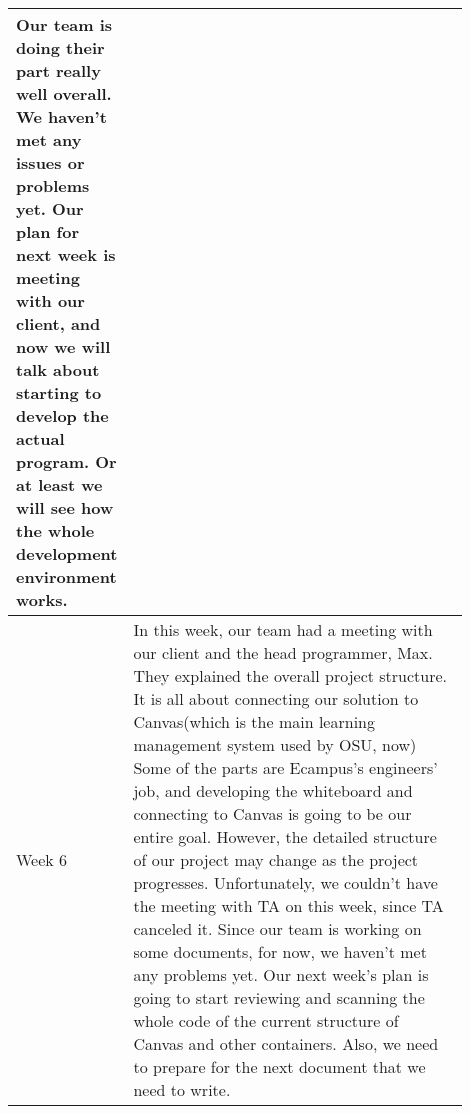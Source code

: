 \documentclass[10pt]{article}
\begin{document}
\begin{center}
\begin{tabular}{ | p{0.1\linewidth} | p{0.8\linewidth} | }
            Our team is doing their part really well overall.
            We haven't met any issues or problems yet.
            Our plan for next week is meeting with our client, and now we will talk about starting to develop the actual program.
            Or at least we will see how the whole development environment works.  \\ \hline 
            Week 6 &  In this week, our team had a meeting with our client and the head programmer, Max.
            They explained the overall project structure. It is all about connecting our solution to Canvas(which is the main learning management system used by OSU, now)
            Some of the parts are Ecampus's engineers' job, and developing the whiteboard and connecting to Canvas is going to be our entire goal.
            However, the detailed structure of our project may change as the project progresses.
            Unfortunately, we couldn't have the meeting with TA on this week, since TA canceled it.
            Since our team is working on some documents, for now, we haven't met any problems yet.
            Our next week's plan is going to start reviewing and scanning the whole code of the current structure of Canvas and other containers.
            Also, we need to prepare for the next document that we need to write.  \\ \hline 
        \end{tabular}   
    

\end{center}
\end{document}
